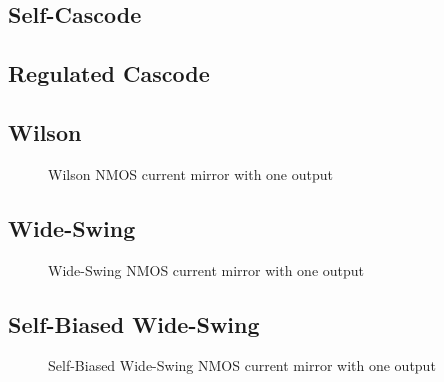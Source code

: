 \documentclass{article}[11pt]
\begin{document}
\subsection{Self-Cascode}
\cite{self-cascode}

\subsection{Regulated Cascode}

\cite{sackinger-rgc-90}
\cite{coban-rrop-94}
\cite{helfenstein-gainboostop-95}

\subsection{Wilson}

\begin{figure}[H]
  \centering
  \begin{circuitikz}
        
  \end{circuitikz}
  \caption{Wilson NMOS current mirror with one output}
  \label{fig:classic-nmos-1}
\end{figure}



\subsection{Wide-Swing}

\begin{figure}[H]
  \centering
  \begin{circuitikz}
    
  \end{circuitikz}
  \caption{Wide-Swing NMOS current mirror with one output}
  \label{fig:ws-nmos-1}
\end{figure}

\subsection{Self-Biased Wide-Swing}

\begin{figure}[H]
  \centering
  \begin{circuitikz}
    
  \end{circuitikz}
  \caption{Self-Biased Wide-Swing NMOS current mirror with one output}
  \label{fig:sb-ws-nmos-1}
\end{figure}
\end{document}
